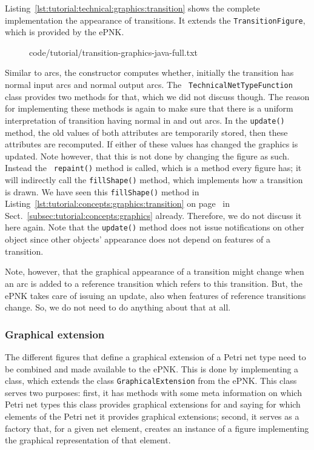 Listing~\ref{lst:tutorial:technical:graphics:transition} shows the complete
implementation the appearance of transitions.
It extends the {\tt TransitionFigure}, which is provided by the ePNK.
%
\begin{figure}[htbp!]
%
  {code/tutorial/transition-graphics-java-full.txt}
\end{figure}
%
Similar to arcs, the constructor computes whether, initially the transition has
normal input arcs and normal output arcs. The {\tt
TechnicalNetType\optsep{}Function} class provides two methods for that, which we
did not discuss though. The reason for implementing  these methods is again to make sure that there is a uniform
interpretation of transition having normal in and out arcs. In the {\tt update()} method, the old values of
both attributes are temporarily stored, then these attributes are recomputed.
If either of these values has changed the graphics is updated. Note however,
that this is not done by changing the figure as such. Instead the {\tt
repaint()} method is called, which is a method every figure has; it will
indirectly call the {\tt fillShape()} method, which implements how a transition
is drawn. We have seen this {\tt fillShape()} method in
Listing~\ref{lst:tutorial:concepts:graphics:transition} on
page~\pageref{lst:tutorial:concepts:graphics:transition} in
Sect.~\ref{subsec:tutorial:concepts:graphics} already.
Therefore, we do not discuss it here again. Note that the {\tt update()} method does not issue
notifications on other object since other objects' appearance does not depend on
features of a transition.

Note, however, that the graphical appearance of a transition might change
when an arc is added to a reference transition which refers to this transition.
But, the ePNK takes care of issuing an update, also when features of reference
transitions change. So, we do not need to do anything about that at all.


\subsubsection{Graphical extension}
\label{subsubsec:tutorial:technical:graphics:extension}

The different figures that define a graphical extension of a Petri net type need
to be combined and made available to the ePNK. This is done by
implementing a class, which extends the class {\tt GraphicalExtension} from the
ePNK. This class serves two purposes: first, it has methods with some meta
information on which Petri net types this class provides graphical
extensions for and saying for which elements of the Petri net it
provides graphical extensions; second, it serves as a factory that, for a given
net element, creates an instance of a figure implementing the graphical
representation of that element.


